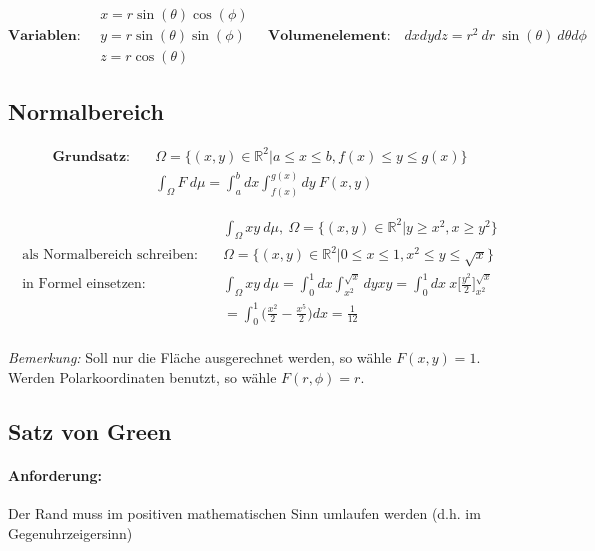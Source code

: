 \documentclass[11pt]{article}
\begin{document}
\begin{equation*}
	\textbf{Variablen:}\quad \begin{matrix}
		x = r\sin(\theta)\cos(\phi) \\ y = r\sin(\theta)\sin(\phi) \\ z = r\cos(\theta)
	\end{matrix} \quad \textbf{Volumenelement:}\quad dxdydz = r^2\ dr\ \sin(\theta)\ d\theta d\phi
\end{equation*}

\subsection{Normalbereich}

\begin{equation*}
\begin{split}
	\textbf{Grundsatz:}\quad & \Omega = \{(x,y) \in \mathbb{R}^2| a \leq x \leq b, f(x) \leq y \leq g(x)\} \\
	& \int_\Omega F\ d\mu = \int_a^b dx \int_{f(x)}^{g(x)} dy\ F(x,y)
\end{split}
\end{equation*}

\begin{equation*}
\begin{split}
	& \int_\Omega xy\ d\mu,\ \Omega = \{(x,y) \in \mathbb{R}^2| y \geq x^2, x \geq y^2 \} \\
	\text{als Normalbereich schreiben:}\quad & \Omega = \{(x,y) \in \mathbb{R}^2| 0 \leq x \leq 1, x^2 \leq y \leq \sqrt{x}\} \\
	\text{in Formel einsetzen:}\quad & \int_\Omega xy\ d\mu = \int_0^1 dx\int_{x^2}^{\sqrt{x}} dyxy = \int_0^1 dx\ x \Big[\frac{y^2}{2}\Big]_{x^2}^{\sqrt{x}} \\
	& = \int_0^1 \Big(\frac{x^2}{2}-\frac{x^5}{2}\Big)dx = \frac{1}{12} \\
\end{split}
\end{equation*}

\emph{Bemerkung:} Soll nur die Fl{\"a}che ausgerechnet werden, so w{\"a}hle $F(x,y) = 1$. Werden Polarkoordinaten benutzt, so w{\"a}hle $F(r, \phi) = r$.

\subsection{Satz von Green}

\paragraph{Anforderung:} Der Rand muss im positiven mathematischen Sinn umlaufen werden (d.h. im Gegenuhrzeigersinn)
\end{document}
